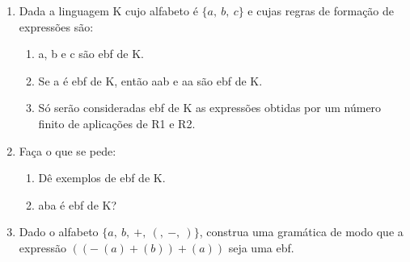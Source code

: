 \begin{enumerate}[label=\arabic*)]
\begin{enumerate}[label=\alph*)]
        \item Dada a linguagem K cujo alfabeto é $\{a,\ b,\ c\}$ e cujas regras de formação de expressões são:
        \begin{enumerate}[label=R{\arabic*}.]
            \item a, b e c são ebf de K.
            \item Se a é ebf de K, então aab e aa são ebf de K.
            \item Só serão consideradas ebf de K as expressões obtidas por um número finito de aplicações de R1 e R2.
        \end{enumerate}

        \item[] Faça o que se pede:
        \begin{enumerate}[label=\roman*)]
            \item Dê exemplos de ebf de K.
            \item aba é ebf de K?
        \end{enumerate}

        \item Dado o alfabeto $\{ a,\ b,\ +,\ (,\ -,\ )\}$, construa uma gramática de modo que a expressão $((-\ (a) + (b)) + (a))$ seja uma ebf.

    \end{enumerate}
\end{enumerate}
